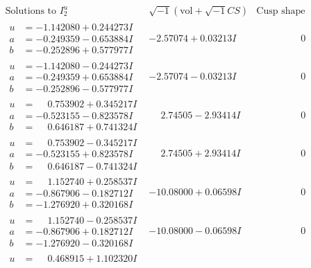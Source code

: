 \documentclass[1p]{elsarticle_modified}
\theoremstyle{definition}
\newcommand{\I}{\sqrt{-1}}
\begin{document}
$$\begin{array}{c|c|c}
\text{Solutions to }I^u_{2}& \I (\text{vol} + \sqrt{-1}CS) & \text{Cusp shape}\\
 \hline 
\begin{aligned}
u &= -1.142080 + 0.244273 I \\
a &= -0.249359 - 0.653884 I \\
b &= -0.252896 + 0.577977 I\end{aligned}
 & -2.57074 + 0.03213 I & \phantom{-0.000000 } 0 \\ \hline\begin{aligned}
u &= -1.142080 - 0.244273 I \\
a &= -0.249359 + 0.653884 I \\
b &= -0.252896 - 0.577977 I\end{aligned}
 & -2.57074 - 0.03213 I & \phantom{-0.000000 } 0 \\ \hline\begin{aligned}
u &= \phantom{-}0.753902 + 0.345217 I \\
a &= -0.523155 - 0.823578 I \\
b &= \phantom{-}0.646187 + 0.741324 I\end{aligned}
 & \phantom{-}2.74505 - 2.93414 I & \phantom{-0.000000 } 0 \\ \hline\begin{aligned}
u &= \phantom{-}0.753902 - 0.345217 I \\
a &= -0.523155 + 0.823578 I \\
b &= \phantom{-}0.646187 - 0.741324 I\end{aligned}
 & \phantom{-}2.74505 + 2.93414 I & \phantom{-0.000000 } 0 \\ \hline\begin{aligned}
u &= \phantom{-}1.152740 + 0.258537 I \\
a &= -0.867906 - 0.182712 I \\
b &= -1.276920 + 0.320168 I\end{aligned}
 & -10.08000 + 0.06598 I & \phantom{-0.000000 } 0 \\ \hline\begin{aligned}
u &= \phantom{-}1.152740 - 0.258537 I \\
a &= -0.867906 + 0.182712 I \\
b &= -1.276920 - 0.320168 I\end{aligned}
 & -10.08000 - 0.06598 I & \phantom{-0.000000 } 0 \\ \hline\begin{aligned}
u &= \phantom{-}0.468915 + 1.102320 I \\

\end{aligned}
\end{array}$$
\end{document}
